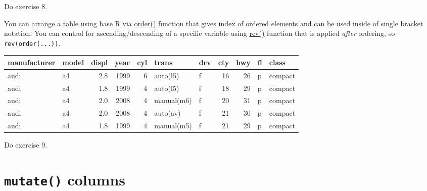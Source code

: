 \documentclass[
]{book}
\newenvironment{Shaded}{\begin{snugshade}}{\end{snugshade}}
\newcommand{\FunctionTok}[1]{\textcolor[rgb]{0.00,0.00,0.00}{#1}}
\newcommand{\NormalTok}[1]{#1}
\newcommand{\SpecialCharTok}[1]{\textcolor[rgb]{0.00,0.00,0.00}{#1}}
\begin{document}
Do exercise 8.

You can arrange a table using base R via \href{https://stat.ethz.ch/R-manual/R-devel/library/base/html/order.html}{order()} function that gives index of ordered elements and can be used inside of single bracket notation. You can control for ascending/descending of a specific variable using \href{https://stat.ethz.ch/R-manual/R-devel/library/base/html/rev.html}{rev()} function that is applied \emph{after} ordering, so \texttt{rev(order(...))}.

\begin{Shaded}
\end{Shaded}

\begin{Shaded}
\end{Shaded}

\begin{tabular}{l|l|r|r|r|l|l|r|r|l|l}
\hline
manufacturer & model & displ & year & cyl & trans & drv & cty & hwy & fl & class\\
\hline
audi & a4 & 2.8 & 1999 & 6 & auto(l5) & f & 16 & 26 & p & compact\\
\hline
audi & a4 & 1.8 & 1999 & 4 & auto(l5) & f & 18 & 29 & p & compact\\
\hline
audi & a4 & 2.0 & 2008 & 4 & manual(m6) & f & 20 & 31 & p & compact\\
\hline
audi & a4 & 2.0 & 2008 & 4 & auto(av) & f & 21 & 30 & p & compact\\
\hline
audi & a4 & 1.8 & 1999 & 4 & manual(m5) & f & 21 & 29 & p & compact\\
\hline
\end{tabular}

Do exercise 9.

\hypertarget{mutate}{%
\section{\texorpdfstring{\texttt{mutate()} columns}{mutate() columns}}\label{mutate}}
\end{document}
